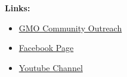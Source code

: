 \documentclass[11pt]{article}
\begin{document}
    \textbf{Links:}
    \begin{itemize}
        \item \textcolor{blue}{\href{https://www.reach2sudharsan.com/independent-research--gmo.html}{GMO Community Outreach}}
        \item \textcolor{blue}{\href{https://www.facebook.com/National-4-H-Science-Matters-Project-Get-to-know-GMOs-112058317207683/?view_public_for=112058317207683}{Facebook Page}}
        \item \textcolor{blue}{\href{https://www.youtube.com/channel/UCbFpUuam0C-5Ge0Y3BrbvLw/videos?app=desktop}{Youtube Channel}}
    \end{itemize}
\end{document}
